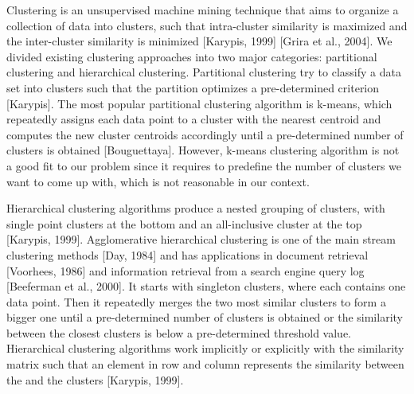 Clustering is an unsupervised machine mining technique that aims to organize a collection of data into clusters, such that intra-cluster similarity is maximized and the inter-cluster similarity is minimized [Karypis, 1999] [Grira et al., 2004]. We divided existing clustering approaches into two major categories: partitional clustering and hierarchical clustering. Partitional clustering try to classify a data set into  clusters such that the partition optimizes a pre-determined criterion [Karypis]. The most popular partitional clustering algorithm is k-means, which repeatedly assigns each data point to a cluster with the nearest centroid and computes the new cluster centroids accordingly until a pre-determined number of clusters is obtained [Bouguettaya]. However, k-means clustering algorithm is not a good fit to our problem since it requires to predefine the number of clusters we want to come up with, which is not reasonable in our context. %

Hierarchical clustering algorithms produce a nested grouping of clusters, with single point clusters at the bottom and an all-inclusive cluster at the top [Karypis, 1999]. Agglomerative hierarchical clustering is one of the main stream clustering methods [Day, 1984] and has applications in document retrieval [Voorhees, 1986] and information retrieval from a search engine query log [Beeferman et al., 2000]. It starts with singleton clusters, where each contains one data point. Then it repeatedly merges the two most similar clusters to form a bigger one until a pre-determined number of clusters is obtained or the similarity between the closest clusters is below a pre-determined threshold value. Hierarchical clustering algorithms work implicitly or explicitly with the  similarity matrix such that an element in row  and column  represents the similarity between the  and the  clusters [Karypis, 1999]. 


